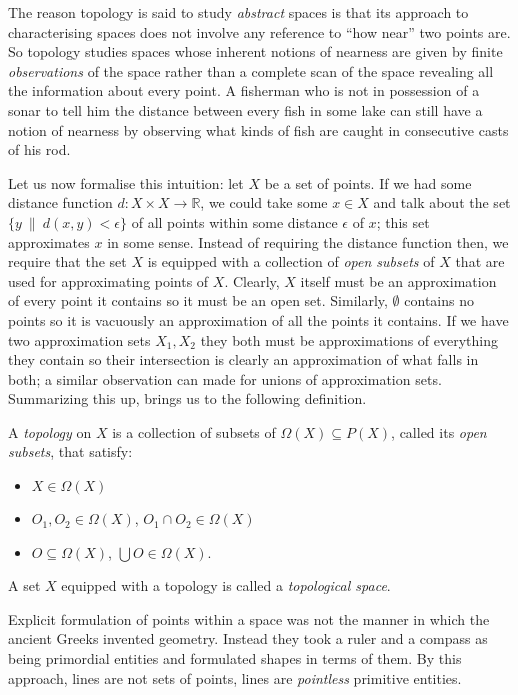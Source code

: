 \documentclass{article}
\begin{document}
The reason topology is said to study \emph{abstract} spaces is that its approach to
characterising spaces does not involve any reference to ``how near'' two points are. So
topology studies spaces whose inherent notions of nearness are given by finite
\emph{observations} of the space rather than a complete scan of the space revealing all
the information about every point. A fisherman who is not in possession of a sonar to tell
him the distance between every fish in some lake can still have a notion of nearness by
observing what kinds of fish are caught in consecutive casts of his rod.

Let us now formalise this intuition: let $X$ be a set of points. If we had some distance
function $d : X \times X \rightarrow \mathbb{R}$, we could take some $x \in X$ and talk about the set $\{
y\ \|\ d(x, y) < \epsilon \}$ of all points within some distance $\epsilon$ of $x$; this set
approximates $x$ in some sense. Instead of requiring the distance function then, we
require that the set $X$ is equipped with a collection of \emph{open subsets} of $X$ that
are used for approximating points of $X$. Clearly, $X$ itself must be an approximation of
every point it contains so it must be an open set. Similarly, $\emptyset$ contains no points so it
is vacuously an approximation of all the points it contains. If we have two approximation
sets $X_1, X_2$ they both must be approximations of everything they contain so their
intersection is clearly an approximation of what falls in both; a similar observation can
made for unions of approximation sets. Summarizing this up, brings us to the following
definition.

A \emph{topology} on $X$ is a collection of subsets of $\Omega(X) \subseteq P(X)$, called its
\emph{open subsets}, that satisfy:
\begin{itemize}
  \item $X \in \Omega(X)$
  \item $O_1, O_2 \in \Omega(X)$, $O_1 \cap O_2 \in \Omega(X)$
  \item $O \subseteq \Omega(X)$, $\bigcup O \in \Omega(X)$.
\end{itemize}

A set $X$ equipped with a topology is called a \emph{topological space}.

Explicit formulation of points within a space was not the manner in which the ancient
Greeks invented geometry. Instead they took a ruler and a compass as being primordial
entities and formulated shapes in terms of them. By this approach, lines are not sets of
points, lines are \emph{pointless} primitive entities.
\end{document}
